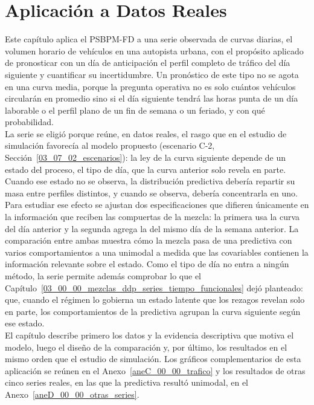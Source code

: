 \chapter{Aplicación a Datos Reales}
\label{04_00_00_aplicacion}


Este capítulo aplica el PSBPM-FD a una serie observada de curvas diarias, el volumen horario de vehículos en una autopista urbana, con el propósito aplicado de pronosticar con un día de anticipación el perfil completo de tráfico del día siguiente y cuantificar su incertidumbre. Un pronóstico de este tipo no se agota en una curva media, porque la pregunta operativa no es solo cuántos vehículos circularán en promedio sino si el día siguiente tendrá las horas punta de un día laborable o el perfil plano de un fin de semana o un feriado, y con qué probabilidad.\\

La serie se eligió porque reúne, en datos reales, el rasgo que en el estudio de simulación favorecía al modelo propuesto (escenario C-2, Sección~\ref{03_07_02_escenarios}): la ley de la curva siguiente depende de un estado del proceso, el tipo de día, que la curva anterior solo revela en parte. Cuando ese estado no se observa, la distribución predictiva debería repartir su masa entre perfiles distintos, y cuando se observa, debería concentrarla en uno. Para estudiar ese efecto se ajustan dos especificaciones que difieren únicamente en la información que reciben las compuertas de la mezcla: la primera usa la curva del día anterior y la segunda agrega la del mismo día de la semana anterior. La comparación entre ambas muestra cómo la mezcla pasa de una predictiva con varios comportamientos a una unimodal a medida que las covariables contienen la información relevante sobre el estado. Como el tipo de día no entra a ningún método, la serie permite además comprobar lo que el Capítulo~\ref{03_00_00_mezclas_ddp_series_tiempo_funcionales} dejó planteado: que, cuando el régimen lo gobierna un estado latente que los rezagos revelan solo en parte, los comportamientos de la predictiva agrupan la curva siguiente según ese estado.\\

El capítulo describe primero los datos y la evidencia descriptiva que motiva el modelo, luego el diseño de la comparación y, por último, los resultados en el mismo orden que el estudio de simulación. Los gráficos complementarios de esta aplicación se reúnen en el Anexo~\ref{aneC_00_00_trafico} y los resultados de otras cinco series reales, en las que la predictiva resultó unimodal, en el Anexo~\ref{aneD_00_00_otras_series}.

